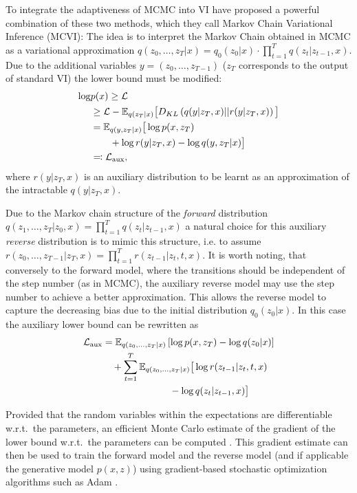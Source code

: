To integrate the adaptiveness of MCMC into VI \parencite{Salimans2014} have proposed a powerful combination of these two methods, which they call Markov Chain Variational Inference (MCVI): The idea is to interpret the Markov Chain obtained in MCMC as a variational approximation $q(z_0, \dots, z_T|x) = q_{0}(z_0|x) \cdot \prod_{t=1}^T q(z_t|z_{t-1}, x)$. Due to the additional variables $y = (z_0, \dots, z_{T-1})$ ($z_T$ corresponds to the output of standard VI) the lower bound must be modified:
\begin{equation}
\begin{split}
\log &p(x) \geq \mathcal{L} \\
	   &\geq \mathcal{L} - \mathbb{E}_{q(z_T|x)} \big[ D_{KL} \left( q(y |z_T, x) || r(y|z_T, x) \right) \big] \\
	   &=  \mathbb{E}_{q(y, z_T|x)} \big[ \log p(x, z_T) \\
	   &\qquad + \log r(y |z_T, x) - \log q(y, z_{T} |x) \big] \\
	   &\eqqcolon \mathcal{L}_{\textrm{aux}},
\end{split}
\end{equation}
where $r(y|z_T, x)$ is an auxiliary distribution to be learnt as an approximation of the intractable $q(y |z_T, x)$. 

Due to the Markov chain structure of the \textit{forward} distribution $q(z_1, \dots, z_T|z_0, x) = \prod_{t=1}^T q(z_t|z_{t-1}, x)$ a natural choice for this auxiliary \textit{reverse} distribution is to mimic this structure, i.e. to assume $r(z_0, \dots, z_{T-1} |z_T, x) = \prod_{t=1}^T r(z_{t-1}|z_t, t, x)$. It is worth noting, that conversely to the forward model, where the transitions should be independent of the step number (as in MCMC), the auxiliary reverse model may use the step number to achieve a better approximation. This allows the reverse model to capture the decreasing bias due to the initial distribution $q_0(z_0|x)$. In this case the auxiliary lower bound can be rewritten as
\begin{equation} \label{eq:MCVIAuxLowerBound}
\begin{split}
\mathcal{L}_{\textrm{aux}} &= \mathbb{E}_{q(z_0, \dots, z_T|x)} \left[ \log p(x, z_T) - \log q(z_0|x) \right] \\
& \quad + \sum_{t=1}^T \mathbb{E}_{q(z_0, \dots, z_T|x)} \big[ \log r(z_{t-1}|z_t, t, x) \\
& \quad\qquad\qquad\qquad - \log q(z_t|z_{t-1}, x)  \big] 
\end{split}
\end{equation}

Provided that the random variables within the expectations are differentiable w.r.t.\ the parameters, an efficient Monte Carlo estimate of the gradient of the lower bound w.r.t.\ the parameters can be computed \parencite{Kingma2014, Rezende2014}. This gradient estimate can then be used to train the forward model and the reverse model (and if applicable the generative model $p(x, z)$) using gradient-based stochastic optimization algorithms such as Adam \parencite{Kingma2015}.
